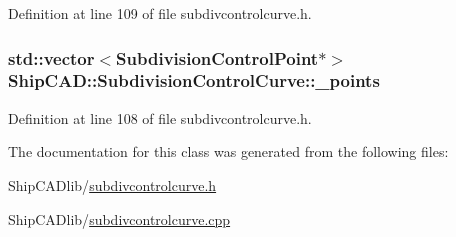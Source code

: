 Definition at line 109 of file subdivcontrolcurve.\-h.

\hypertarget{classShipCAD_1_1SubdivisionControlCurve_ac54ea0783b3f8f2aa65d49fe489f1b4f}{
\subsubsection[{\-\_\-points}]{\setlength{\rightskip}{0pt plus 5cm}std\-::vector$<${\bf Subdivision\-Control\-Point}$\ast$$>$ Ship\-C\-A\-D\-::\-Subdivision\-Control\-Curve\-::\-\_\-points\hspace{0.3cm}{\ttfamily [protected]}}}\label{classShipCAD_1_1SubdivisionControlCurve_ac54ea0783b3f8f2aa65d49fe489f1b4f}


Definition at line 108 of file subdivcontrolcurve.\-h.



The documentation for this class was generated from the following files\-:\begin{DoxyCompactItemize}
\item 
Ship\-C\-A\-Dlib/\hyperlink{subdivcontrolcurve_8h}{subdivcontrolcurve.\-h}\item 
Ship\-C\-A\-Dlib/\hyperlink{subdivcontrolcurve_8cpp}{subdivcontrolcurve.\-cpp}\end{DoxyCompactItemize}
